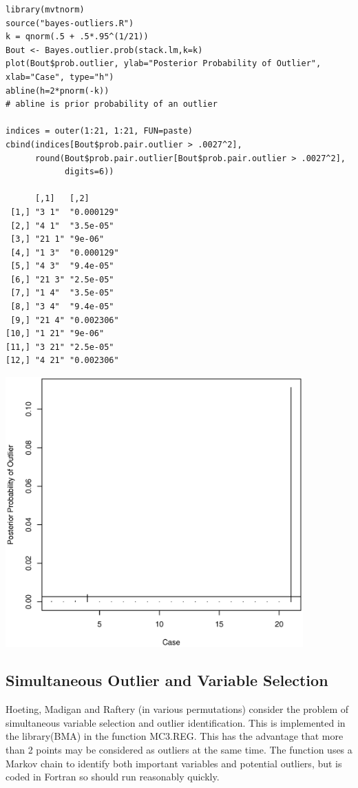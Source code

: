 \documentclass[11]{article}
\begin{document}
\begin{verbatim}
library(mvtnorm)    
source("bayes-outliers.R")
k = qnorm(.5 + .5*.95^(1/21))
Bout <- Bayes.outlier.prob(stack.lm,k=k)
plot(Bout$prob.outlier, ylab="Posterior Probability of Outlier", xlab="Case", type="h")
abline(h=2*pnorm(-k))
# abline is prior probability of an outlier

indices = outer(1:21, 1:21, FUN=paste)
cbind(indices[Bout$prob.pair.outlier > .0027^2],
      round(Bout$prob.pair.outlier[Bout$prob.pair.outlier > .0027^2],
            digits=6))

      [,1]   [,2]      
 [1,] "3 1"  "0.000129"
 [2,] "4 1"  "3.5e-05" 
 [3,] "21 1" "9e-06"   
 [4,] "1 3"  "0.000129"
 [5,] "4 3"  "9.4e-05" 
 [6,] "21 3" "2.5e-05" 
 [7,] "1 4"  "3.5e-05" 
 [8,] "3 4"  "9.4e-05" 
 [9,] "21 4" "0.002306"
[10,] "1 21" "9e-06"   
[11,] "3 21" "2.5e-05" 
[12,] "4 21" "0.002306"
\end{verbatim}

\centerline{\includegraphics[width=4.5in]{stackloss-bayes.ps}}

\subsection*{Simultaneous Outlier and Variable Selection}
Hoeting, Madigan and Raftery (in various permutations) consider the problem of simultaneous variable selection and outlier identification.  This is implemented in the library(BMA) in the function MC3.REG.
This has the advantage that more than 2 points may be considered as outliers at the same time.
The function uses a Markov chain to identify both important variables and potential outliers, but is coded in Fortran so should run reasonably quickly.
\end{document}
